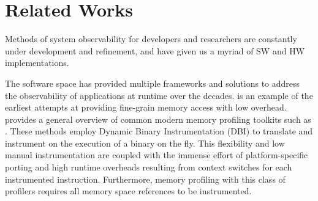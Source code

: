 \section{Related Works}
\label{sec:Related}






Methods of system observability for developers and researchers are constantly under development and refinement, and have given us a myriad of SW and HW  implementations. 

The software space has provided multiple frameworks and solutions to address the observability of applications at runtime over the decades. \cite{ScalesShasta} is an example of the earliest attempts at providing fine-grain memory access with low overhead. \cite{MemProfSurvey} provides a general overview of common modern memory profiling toolkits such as \cite{LUK-PIN} \cite{BrueningTDI} \cite{Valgrind}. These methods employ Dynamic Binary Instrumentation (DBI) to translate and instrument on the execution of a binary on the fly. This flexibility and low manual instrumentation are coupled with the immense effort of platform-specific porting and high runtime overheads resulting from context switches for each instrumented instruction. Furthermore, memory profiling with this class of profilers requires all memory space references to be instrumented.


